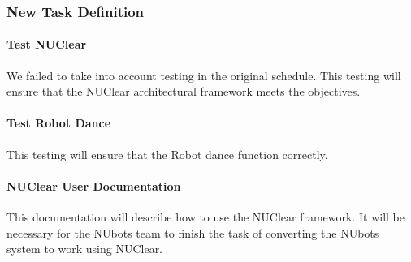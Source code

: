 \documentclass[a4paper]{article}
\begin{document}
			\subsubsection{New Task Definition}
				\paragraph{Test NUClear}
					We failed to take into account testing in the original schedule. This testing will ensure that the NUClear architectural framework meets the objectives.
				\paragraph{Test Robot Dance}
					This testing will ensure that the Robot dance function correctly.
				\paragraph{NUClear User Documentation}
					This documentation will describe how to use the NUClear framework. It will be necessary for the NUbots team to finish the task of converting the NUbots system to work using NUClear.
					
\end{document}
